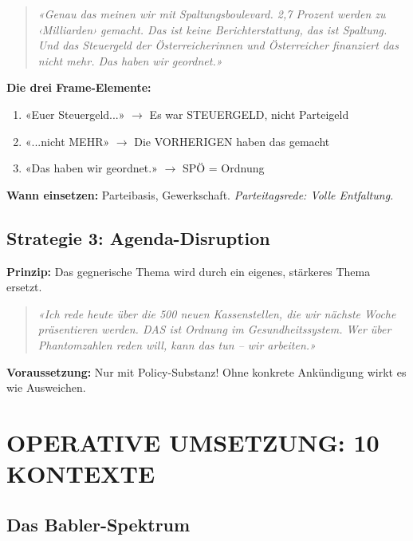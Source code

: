 \documentclass[11pt,a4paper]{article}
\begin{document}
\begin{quote}
\textit{«Genau das meinen wir mit Spaltungsboulevard. 2,7 Prozent werden zu ‹Milliarden› gemacht. Das ist keine Berichterstattung, das ist Spaltung. Und das Steuergeld der Österreicherinnen und Österreicher finanziert das nicht mehr. Das haben wir geordnet.»}
\end{quote}

\textbf{Die drei Frame-Elemente:}
\begin{enumerate}
    \item «Euer Steuergeld...» $\rightarrow$ Es war STEUERGELD, nicht Parteigeld
    \item «...nicht MEHR» $\rightarrow$ Die VORHERIGEN haben das gemacht
    \item «Das haben wir geordnet.» $\rightarrow$ SPÖ = Ordnung
\end{enumerate}

\textbf{Wann einsetzen:} Parteibasis, Gewerkschaft. \textit{Parteitagsrede: Volle Entfaltung.}

\subsection{Strategie 3: Agenda-Disruption}

\textbf{Prinzip:} Das gegnerische Thema wird durch ein eigenes, stärkeres Thema ersetzt.

\begin{quote}
\textit{«Ich rede heute über die 500 neuen Kassenstellen, die wir nächste Woche präsentieren werden. DAS ist Ordnung im Gesundheitssystem. Wer über Phantomzahlen reden will, kann das tun -- wir arbeiten.»}
\end{quote}

\textbf{Voraussetzung:} Nur mit Policy-Substanz! Ohne konkrete Ankündigung wirkt es wie Ausweichen.

\newpage


\section{OPERATIVE UMSETZUNG: 10 KONTEXTE}

\subsection{Das Babler-Spektrum}
\end{document}
